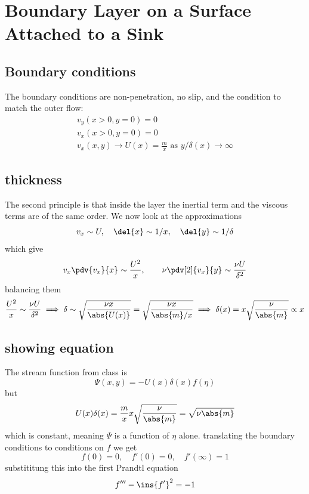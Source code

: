 \clearpage
\section{Boundary Layer on a Surface Attached to a Sink}
\subsection{Boundary conditions}
The boundary conditions are non-penetration, no slip, and the condition to match the outer flow:
\begin{align}
	v_y(x>0,y=0)=0\\
	v_x(x>0,y=0)=0\\
	v_x(x,y) \to U(x)=\frac{m}{x} \text{ as } y/\delta(x)\to\infty
\end{align}
\subsection{thickness}
The second principle is that inside the layer the inertial term and the viscous terms are of the same order. We now look at the approximations 
\begin{equation}
	v_x \sim U,\quad \del{x}\sim1/x,\quad \del{y}\sim1/\delta
\end{equation}
which give
\begin{equation}
	v_x\pdv{v_x}{x}\sim\frac{U^2}{x},\qquad \nu\pdv[2]{v_x}{y}\sim\frac{\nu U}{\delta^2}
\end{equation}
balancing them 
\begin{equation}
	\frac{U^2}{x}\sim\frac{\nu U}{\delta^2} \implies \delta\sim\sqrt{\frac{\nu x}{\abs{U(x)}}}=\sqrt{\frac{\nu x}{\abs{m}/x}}\implies \delta(x)=x\sqrt{\frac{\nu}{\abs{m}}}\propto x
\end{equation}
\subsection{showing equation}
The stream function from class is 
\begin{equation}
	\Psi(x,y) = -U(x)\delta(x)f(\eta)
\end{equation}
but 
\begin{equation}
	U(x)\delta(x)=\frac{m}{x}x\sqrt{\frac{\nu}{\abs{m}}}=\sqrt{\nu \abs{m}}
\end{equation}
which is constant, meaning \(\Psi\) is a function of \(\eta\) alone. translating the boundary conditions to conditions on \(f\) we get 
\begin{equation}
	f(0)=0,\quad f'(0)=0,\quad f'(\infty)=1
\end{equation}
substititung this into the first Prandtl equation 
\begin{equation}
	f'''-\ins{f'}^2=-1
\end{equation}
